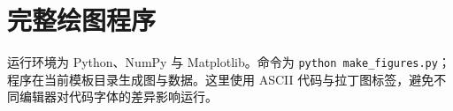 \documentclass[UTF8,a4paper,zihao=-4,fontset=fandol]{ctexart}
\begin{document}
\section{完整绘图程序}
运行环境为 Python、NumPy 与 Matplotlib。命令为 \texttt{python make\_figures.py}；程序在当前模板目录生成图与数据。这里使用 ASCII 代码与拉丁图标签，避免不同编辑器对代码字体的差异影响运行。

\end{document}
